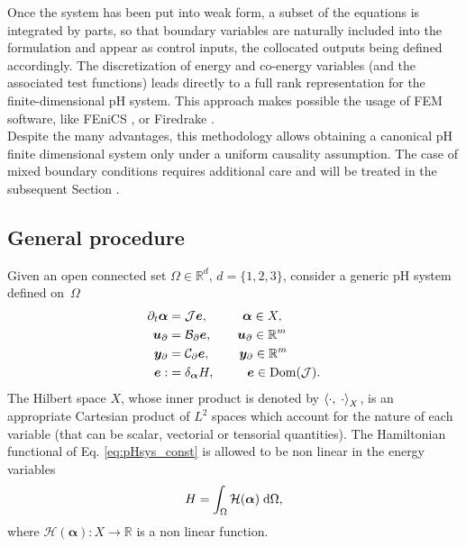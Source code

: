 Once the system has been put into weak form, a subset of the equations is integrated by parts, so that boundary variables are naturally included into the formulation and appear as control inputs, the collocated outputs being defined accordingly. The discretization of energy and co-energy variables (and the associated test functions) leads directly to a full rank representation for the finite-dimensional pH system.  This approach makes possible the usage of FEM software, like FEniCS \cite{logg2012}, or Firedrake \cite{rathgeber2017firedrake}. \\

Despite the many advantages, this methodology allows obtaining a canonical pH finite dimensional system only under a uniform causality assumption. The case of mixed boundary conditions requires additional care and will be treated in the subsequent Section .

\subsection{General procedure}
Given an open connected set $\Omega \in \mathbb{R}^d,\, d= \{1,2,3\}$, consider a generic pH system defined on~$\Omega$
\begin{align}
\partial_t {\bm{\alpha}} &= \mathcal{J}\displaystyle \bm{e}, \qquad \;\;\, \bm{\alpha} \in X, \label{eq:pHsys_dyn} \vspace{3pt}\\
\bm{u}_\partial &= \mathcal{B}_\partial  \displaystyle \bm{e}, \qquad \bm{u}_\partial \in \mathbb{R}^m \label{eq:pHsys_u} \vspace{3pt}\\
\bm{y}_\partial &= \mathcal{C}_\partial \displaystyle \bm{e}, \qquad \; \bm{y}_\partial \in \mathbb{R}^m \label{eq:pHsys_y} \vspace{3pt}\\
\bm{e} :&= \displaystyle \delta_{\bm{\alpha}}H, \qquad \;\; \bm{e} \in \Dom(\mathcal{J}). \label{eq:pHsys_const}
\end{align}
The Hilbert space $X$, whose inner product is denoted by $\inner[X]{\cdot}{\cdot}$, is an appropriate Cartesian product of $L^2$ spaces which account for the nature of each variable (that can be scalar, vectorial or tensorial quantities). The Hamiltonian functional of Eq. \eqref{eq:pHsys_const} is allowed to be non linear in the energy variables
\begin{equation*}
H = \int_\Omega \mathcal{H}(\bm{\alpha}) \d\Omega,
\end{equation*}
where $\mathcal{H}(\bm{\alpha}): X \rightarrow \mathbb{R}$ is a non linear function.
 \\

